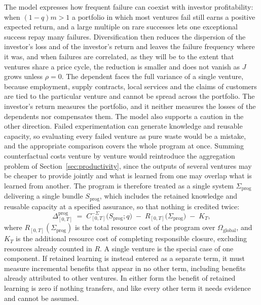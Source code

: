\documentclass[11pt]{article}
\theoremstyle{remark}
\begin{document}
The model expresses how frequent failure can coexist with investor profitability: when $(1-q)m>1$ a portfolio in which most ventures fail still earns a positive expected return, and a large multiple on rare successes lets one exceptional success repay many failures. Diversification then reduces the dispersion of the investor's loss and of the investor's return and leaves the failure frequency where it was, and when failures are correlated, as they will be to the extent that ventures share a price cycle, the reduction is smaller and does not vanish as $J$ grows unless $\rho=0$. The dependent faces the full variance of a single venture, because employment, supply contracts, local services and the claims of customers are tied to the particular venture and cannot be spread across the portfolio. The investor's return measures the portfolio, and it neither measures the losses of the dependents nor compensates them. The model also supports a caution in the other direction. Failed experimentation can generate knowledge and reusable capacity, so evaluating every failed venture as pure waste would be a mistake, and the appropriate comparison covers the whole program at once. Summing counterfactual costs venture by venture would reintroduce the aggregation problem of Section~\ref{sec:productivity}, since the outputs of several ventures may be cheaper to provide jointly and what is learned from one may overlap what is learned from another. The program is therefore treated as a single system $\Sigma_{\mathrm{prog}}$ delivering a single bundle $S_{\mathrm{prog}}$, which includes the retained knowledge and reusable capacity at a specified assurance, so that nothing is credited twice:
\[
\Delta^{\mathrm{prog}}_{[0,T]}\;=\;C^{-\Sigma}_{[0,T]}\bigl(S_{\mathrm{prog}};q\bigr)\;-\;R_{[0,T]}\bigl(\Sigma_{\mathrm{prog}}\bigr)\;-\;K_T ,
\]
where $R_{[0,T]}(\Sigma_{\mathrm{prog}})$ is the total resource cost of the program over $\Omega_{\mathrm{global}}$, and $K_T$ is the additional resource cost of completing responsible closure, excluding resources already counted in $R$. A single venture is the special case of one component. If retained learning is instead entered as a separate term, it must measure incremental benefits that appear in no other term, including benefits already attributed to other ventures. In either form the benefit of retained learning is zero if nothing transfers, and like every other term it needs evidence and cannot be assumed.
\end{document}
